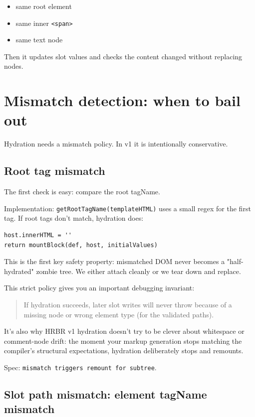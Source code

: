 \begin{itemize}
  \item same root element
  \item same inner \texttt{<span>}
  \item same text node
\end{itemize}

Then it updates slot values and checks the content changed without replacing nodes.

\section{Mismatch detection: when to bail out}

Hydration needs a mismatch policy. In v1 it is intentionally conservative.

\subsection{Root tag mismatch}

The first check is easy: compare the root tagName.

Implementation: \texttt{getRootTagName(templateHTML)} uses a small regex for the first tag.
If root tags don’t match, hydration does:

\begin{verbatim}
host.innerHTML = ''
return mountBlock(def, host, initialValues)
\end{verbatim}

This is the first key safety property: mismatched DOM never becomes a "half-hydrated" zombie tree. We either attach cleanly or we tear down and replace.

This strict policy gives you an important debugging invariant:

\begin{quote}
If hydration succeeds, later slot writes will never throw because of a missing node or wrong element type (for the validated paths).
\end{quote}

It’s also why HRBR v1 hydration doesn’t try to be clever about whitespace or comment-node drift: the moment your markup generation stops matching the compiler’s structural expectations, hydration deliberately stops and remounts.

Spec: \texttt{mismatch triggers remount for subtree}.

\subsection{Slot path mismatch: element tagName mismatch}

